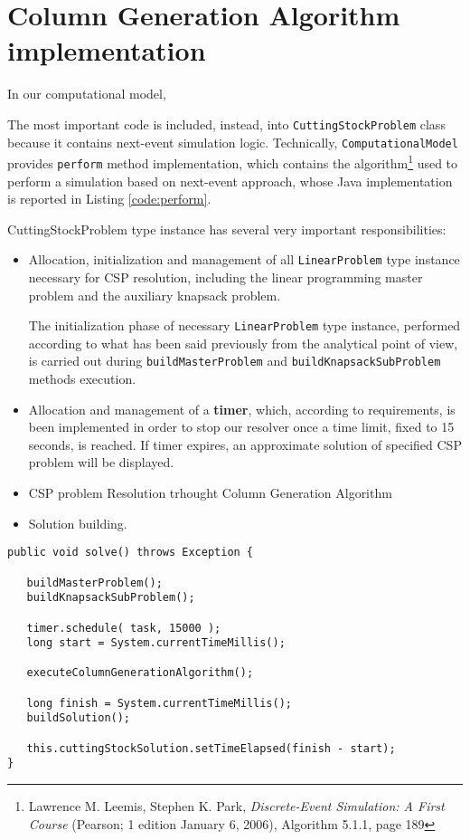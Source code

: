 \documentclass[10pt,a4paper]{article}
\begin{document}
\section{Column Generation Algorithm implementation}

In our computational model, 


The most important code is included, instead, into \texttt{CuttingStockProblem} class because it contains next-event simulation logic. Technically, \texttt{ComputationalModel} provides \texttt{perform} method implementation, which contains the algorithm\footnote{Lawrence M. Leemis, Stephen K. Park, \textit{Discrete-Event Simulation: A First Course} (Pearson; 1 edition January 6, 2006), Algorithm 5.1.1, page 189} used to perform a simulation based on next-event approach, whose Java implementation is reported in Listing \ref{code:perform}. 


CuttingStockProblem type instance has several very important responsibilities:

\begin{itemize}

\item Allocation, initialization and management of all \texttt{LinearProblem} type instance necessary for CSP resolution, including the linear programming master problem and the auxiliary knapsack problem. 

The initialization phase of necessary \texttt{LinearProblem} type instance, performed according to what has been said previously from the analytical point of view, is carried out during \texttt{buildMasterProblem} and \texttt{buildKnapsackSubProblem} methods execution.

\item Allocation and management of a \textbf{timer}, which, according to requirements, is been implemented in order to stop our resolver once a time limit, fixed to 15 seconds, is reached. If timer expires, an approximate solution of specified CSP problem will be displayed.

\item CSP problem Resolution trhought Column Generation Algorithm

\item Solution building.
\end{itemize}



\begin{lstlisting}[frame=lines, caption={\texttt{solve()} method implementation.}, label={code:solve}]
public void solve() throws Exception {

   buildMasterProblem();
   buildKnapsackSubProblem();

   timer.schedule( task, 15000 );
   long start = System.currentTimeMillis();
        
   executeColumnGenerationAlgorithm();
        
   long finish = System.currentTimeMillis();
   buildSolution();

   this.cuttingStockSolution.setTimeElapsed(finish - start);
}
\end{lstlisting}
\end{document}
